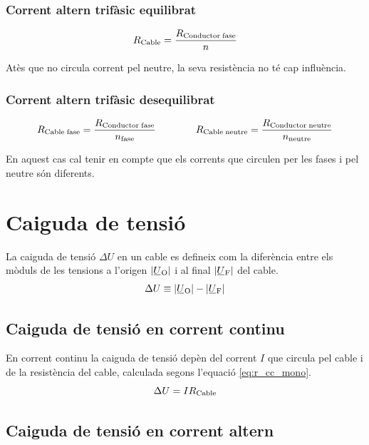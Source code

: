 \subsubsection*{Corrent altern trifàsic equilibrat}
\vspace{-5mm}
\begin{equation}\label{eq:r_trifas}
R_\mathrm{Cable} = \frac{R_\mathrm{Conductor\;fase}}{n}
\end{equation}

Atès que no circula corrent pel neutre, la seva resistència no  té cap influència.

\subsubsection*{Corrent altern trifàsic desequilibrat}
\begin{equation}
    R_\mathrm{Cable\;fase} = \frac{R_\mathrm{Conductor\;fase}}{n_\mathrm{fase}} \qquad\qquad
    R_\mathrm{Cable\; neutre} = \frac{R_\mathrm{Conductor\;neutre}}{n_\mathrm{neutre}}
\end{equation}

En aquest cas cal tenir en compte que els corrents que circulen per les fases i pel neutre
són diferents.


\section{Caiguda de tensió}

La caiguda de tensió $\Delta U$ en un cable es defineix com la diferència entre els mòduls de les tensions a l'origen $|{\cmplx{U}\ped{O}}|$ i al final $|\cmplx{U}\ped{F}|$ del cable.
\begin{equation}
   \Delta U \equiv |\cmplx{U}\ped{O}| - |\cmplx{U}\ped{F}|
\end{equation}

\subsection{Caiguda de tensió en corrent continu}

En corrent continu la caiguda de tensió depèn del corrent $I$ que circula pel cable i de la  resistència del  cable, calculada segons l'equació \eqref{eq:r_cc_mono}.
\begin{equation}
   \Delta U = I R_\mathrm{Cable}
\end{equation}

\subsection{Caiguda de tensió en corrent altern}

